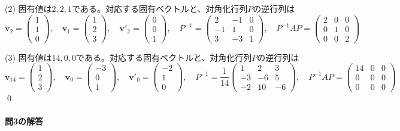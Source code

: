 \noindent (2) 固有値は$2, 2, 1$である。対応する固有ベクトルと、対角化行列$P$の逆行列は
\[
\bm{v}_2 = 
\begin{pmatrix}
1 \\
1 \\
0
\end{pmatrix}, \quad
\bm{v}_1 = 
\begin{pmatrix}
1 \\
2 \\
3
\end{pmatrix}, \quad
\bm{v}'_2 = 
\begin{pmatrix}
0 \\
0 \\
1
\end{pmatrix}, \quad
P^{-1} = 
\begin{pmatrix}
2 & -1 & 0 \\
-1 & 1 & 0 \\
3 & -3 & 1
\end{pmatrix}, \quad
P^{-1} AP =
\begin{pmatrix}
2 & 0 & 0 \\
0 & 1 & 0 \\
0 & 0 & 2
\end{pmatrix}
\]

\noindent (3) 固有値は$14, 0, 0$である。対応する固有ベクトルと、対角化行列$P$の逆行列は
\[
\bm{v}_{14} = 
\begin{pmatrix}
1 \\
2 \\
3
\end{pmatrix}, \quad
\bm{v}_0 = 
\begin{pmatrix}
-3 \\
0 \\
1
\end{pmatrix}, \quad
\bm{v}'_0 = 
\begin{pmatrix}
-2 \\
1 \\
0
\end{pmatrix}, \quad
P^{-1} = 
\frac{1}{14}
\begin{pmatrix}
1 & 2 & 3 \\
-3 & -6 & 5 \\
-2 & 10 & -6
\end{pmatrix}, \quad
P^{-1} AP =
\begin{pmatrix}
14 & 0 & 0 \\
0 & 0 & 0 \\
0 & 0 & 0
\end{pmatrix}
\]
\qed

\paragraph{問3の解答}

